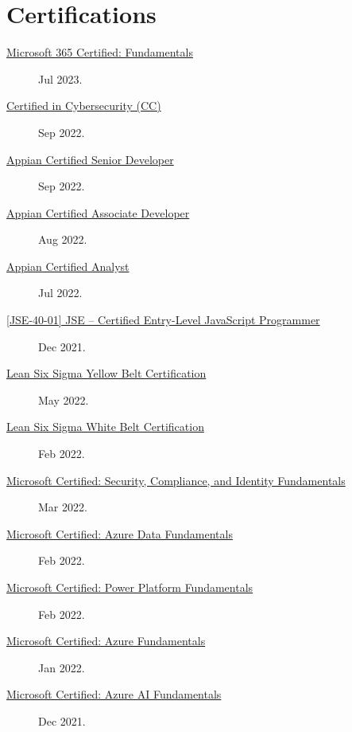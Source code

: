 \documentclass{article}
\begin{document}
\section*{Certifications}\vspace{-0.5em}
\begin{description}
  \item [\href{https://learn.microsoft.com/api/credentials/share/en-us/AlexKoikCestone-7541/34191BBB3EBF09A3?sharingId=DCF7D068E6ED12E6}{Microsoft 365 Certified: Fundamentals}] Jul 2023.
  \item [\href{https://www.credly.com/badges/f0aab7ce-2f5d-4569-8705-3dc23fc34200/public_url}{Certified in Cybersecurity (CC)}] Sep 2022.
  \item [\href{https://community.appian.com/members/alexanderk7594?badge=cert&now=637997122455046997}{Appian Certified Senior Developer}] Sep 2022.
  \item [\href{https://community.appian.com/members/alexanderk7594?badge=cert&now=637997122455046997}{Appian Certified Associate Developer}] Aug 2022.
  \item [\href{https://community.appian.com/members/alexanderk7594?badge=cert&now=637997122455046997}{Appian Certified Analyst}] Jul 2022.
  \item [\href{https://www.credly.com/badges/e75210e4-8d08-43ea-af72-ec70ef666eee/public_url}{[JSE-40-01] JSE – Certified Entry-Level JavaScript Programmer}] Dec 2021.
  \item [\href{https://api.badgr.io/public/assertions/KE5P9gfoQ7S3-hpvZP4PIQ}{Lean Six Sigma Yellow Belt Certification}] May 2022.
  \item [\href{https://api.badgr.io/public/assertions/JhPP0s2rQWWGrc9ZkYqhkg}{Lean Six Sigma White Belt Certification}] Feb 2022.
  \item [\href{https://learn.microsoft.com/api/credentials/share/en-us/AlexKoikCestone-7541/DF45C662407C41C5?sharingId=DCF7D068E6ED12E6}{Microsoft Certified: Security, Compliance, and Identity Fundamentals}] Mar 2022.
  \item [\href{https://learn.microsoft.com/api/credentials/share/en-us/AlexKoikCestone-7541/37294D69297F1741?sharingId=DCF7D068E6ED12E6}{Microsoft Certified: Azure Data Fundamentals}] Feb 2022.
  \item [\href{https://learn.microsoft.com/api/credentials/share/en-us/AlexKoikCestone-7541/CE492D7BE04E2F0D?sharingId=DCF7D068E6ED12E6}{Microsoft Certified: Power Platform Fundamentals}] Feb 2022.
  \item [\href{https://learn.microsoft.com/api/credentials/share/en-us/AlexKoikCestone-7541/51E3A61AEA2E3998?sharingId=DCF7D068E6ED12E6}{Microsoft Certified: Azure Fundamentals}] Jan 2022.
  \item [\href{https://learn.microsoft.com/api/credentials/share/en-us/AlexKoikCestone-7541/32EE850D92B0C609?sharingId=DCF7D068E6ED12E6}{Microsoft Certified: Azure AI Fundamentals}] Dec 2021.
\end{description}
\end{document}
